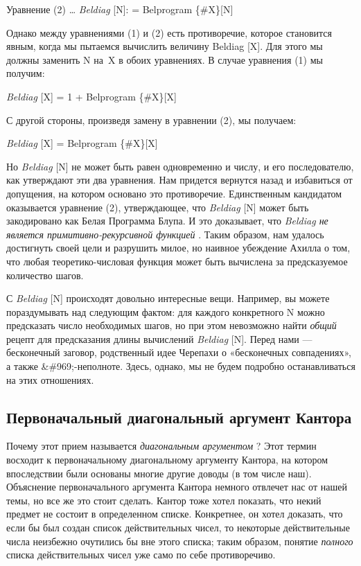 \documentclass[../main.tex]{subfiles}
\begin{document}
Уравнение (2) \ldots{} \emph{Beldiag} {[}N{]}: = Belprogram \{\#X\}{[}N{]}

Однако между уравнениями (1) и (2) есть противоречие, которое становится явным, когда мы пытаемся вычислить величину Beldiag {[}X{]}. Для этого мы должны заменить N на~X в обоих уравнениях. В случае уравнения (1) мы получим:

\emph{Beldiag} {[}X{]} = 1 + Belprogram \{\#X\}{[}X{]}

С другой стороны, произведя замену в уравнении (2), мы получаем:

\emph{Beldiag} {[}X{]} = Belprogram \{\#X\}{[}X{]}

Но \emph{Beldiag} {[}N{]} не может быть равен одновременно и числу, и его последователю, как утверждают эти два уравнения. Нам придется вернутся назад и избавиться от допущения, на котором основано это противоречие. Единственным кандидатом оказывается уравнение (2), утверждающее, что \emph{Beldiag} {[}N{]} может быть закодировано как Белая Программа Блупа. И это доказывает, что \emph{Beldiag не является примитивно-рекурсивной функцией} . Таким образом, нам удалось достигнуть своей цели и разрушить милое, но наивное убеждение Ахилла о том, что любая теоретико-числовая функция может быть вычислена за предсказуемое количество шагов.

С \emph{Beldiag} {[}N{]} происходят довольно интересные вещи. Например, вы можете пораздумывать над следующим фактом: для каждого конкретного N можно предсказать число необходимых шагов, но при этом невозможно найти \emph{общий} рецепт для предсказания длины вычислений \emph{Beldiag} {[}N{]}. Перед нами --- бесконечный заговор, родственный идее Черепахи о «бесконечных совпадениях», а также \&\#969;-неполноте. Здесь, однако, мы не будем подробно останавливаться на этих отношениях.


\subsection{Первоначальный диагональный аргумент Кантора}

Почему этот прием называется \emph{диагональным аргументом} ? Этот термин восходит к первоначальному диагональному аргументу Кантора, на котором впоследствии были основаны многие другие доводы (в том числе наш). Объяснение первоначального аргумента Кантора немного отвлечет нас от нашей темы, но все же это стоит сделать. Кантор тоже хотел показать, что некий предмет не состоит в определенном списке. Конкретнее, он хотел доказать, что если бы был создан список действительных чисел, то некоторые действительные числа неизбежно очутились бы вне этого списка; таким образом, понятие \emph{полного} списка действительных чисел уже само по себе противоречиво.
\end{document}
